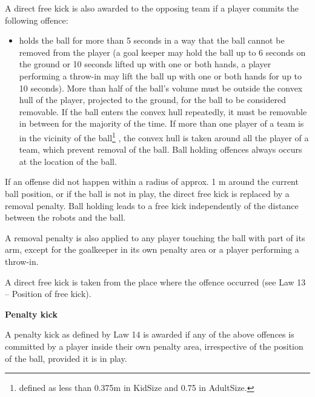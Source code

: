 \bigskip


A direct free kick is also awarded to the opposing team if a player commits
the following offence:

\begin{itemize}
  \item {}holds the ball for more than 5 seconds in a way that the
  ball cannot be removed from the player (a goal keeper may hold the ball up to
  6 seconds on the ground or 10 seconds lifted up with one or both hands,
    a player performing a throw-in may lift the ball up with one or both hands
    for up to 10 seconds). More than half of the ball's volume must be outside
  the convex hull of the player, projected to the ground, for the ball to be
  considered removable. If the ball enters the convex hull repeatedly, it must
  be removable in between for the majority of the time. If more than one player
  of a team is in the vicinity of the ball\footnote{
    defined as less than 0.375m in KidSize and 0.75 in AdultSize.}
  , the convex hull is taken around all
  the player of a team, which prevent removal of the ball.
  Ball holding offences always occurs at the location of the ball.
\end{itemize}

\bigskip

If an offense did not happen within a radius of approx. 1 m
around the current ball position, or if the ball is not in play,
the direct free kick is replaced by a removal penalty.
Ball holding leads to a free kick independently of the distance between
the robots and the ball.

\bigskip

A removal penalty is also applied to any player touching the ball with
part of its arm, except for the goalkeeper in its own penalty area or a player
performing a throw-in.


\bigskip


A direct free kick is taken from the place where the offence occurred (see Law 13 -- Position of free kick).


\bigskip

{\bfseries Penalty kick}

\headlinebox

A penalty kick as defined by Law 14 is awarded if any of the above
offences is committed by a player inside their own penalty area,
irrespective of the position of the ball, provided it is in play.


